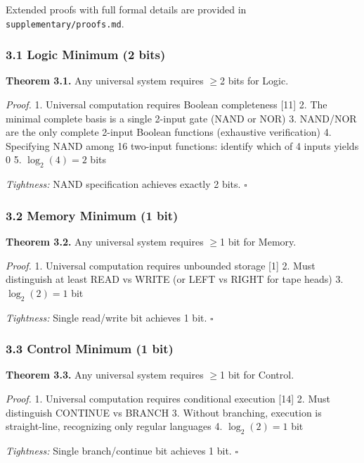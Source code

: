 \documentclass[
  11pt,
]{article}
\begin{document}
Extended proofs with full formal details are provided in
\texttt{supplementary/proofs.md}.

\hypertarget{logic-minimum-2-bits}{%
\subsubsection{3.1 Logic Minimum (2 bits)}\label{logic-minimum-2-bits}}

\textbf{Theorem 3.1.} Any universal system requires $\geq$2 bits for Logic.

\emph{Proof.} 1. Universal computation requires Boolean completeness
{[}11{]} 2. The minimal complete basis is a single 2-input gate (NAND or
NOR) 3. NAND/NOR are the only complete 2-input Boolean functions
(exhaustive verification) 4. Specifying NAND among 16 two-input
functions: identify which of 4 inputs yields 0 5. $\log_2(4) = 2$ bits

\emph{Tightness:} NAND specification achieves exactly 2 bits. $\square$

\hypertarget{memory-minimum-1-bit}{%
\subsubsection{3.2 Memory Minimum (1 bit)}\label{memory-minimum-1-bit}}

\textbf{Theorem 3.2.} Any universal system requires $\geq$1 bit for Memory.

\emph{Proof.} 1. Universal computation requires unbounded storage
{[}1{]} 2. Must distinguish at least READ vs WRITE (or LEFT vs RIGHT for
tape heads) 3. $\log_2(2) = 1$ bit

\emph{Tightness:} Single read/write bit achieves 1 bit. $\square$

\hypertarget{control-minimum-1-bit}{%
\subsubsection{3.3 Control Minimum (1
bit)}\label{control-minimum-1-bit}}

\textbf{Theorem 3.3.} Any universal system requires $\geq$1 bit for Control.

\emph{Proof.} 1. Universal computation requires conditional execution
{[}14{]} 2. Must distinguish CONTINUE vs BRANCH 3. Without branching,
execution is straight-line, recognizing only regular languages 4.
$\log_2(2) = 1$ bit

\emph{Tightness:} Single branch/continue bit achieves 1 bit. $\square$
\end{document}
